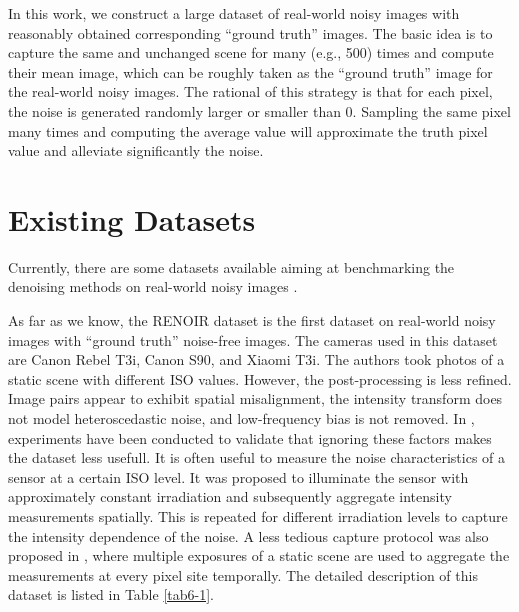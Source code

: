 In this work, we construct a large dataset of real-world noisy images with reasonably obtained corresponding ``ground truth'' images. The basic idea is to capture the same and unchanged scene for many (e.g., 500) times and compute their mean image, which can be roughly taken as the ``ground truth'' image for the real-world noisy images. The rational of this strategy is that for each pixel, the noise is generated randomly larger or smaller than 0. Sampling the same pixel many times and computing the average value will approximate the truth pixel value and alleviate significantly the noise.

\section{Existing Datasets}

Currently, there are some datasets available aiming at benchmarking the denoising methods on real-world noisy images \cite{RENOIR2014,crosschannel2016,dnd2017}.

As far as we know, the RENOIR dataset \cite{RENOIR2014} is the first dataset on real-world noisy images with ``ground truth'' noise-free images. The cameras used in this dataset are Canon Rebel T3i, Canon S90, and Xiaomi T3i. The authors took photos of a static scene with different ISO values. However, the post-processing is less refined. Image pairs appear to exhibit spatial misalignment, the intensity transform does not model heteroscedastic noise, and low-frequency bias is not removed. In \cite{RENOIR2014}, experiments have been conducted to validate that ignoring these factors makes the dataset less usefull. It is often useful to measure the noise characteristics of a sensor at a certain ISO level. It was proposed \cite{RENOIR2014} to illuminate the sensor with approximately constant irradiation and subsequently aggregate intensity measurements spatially. This is repeated for different irradiation levels to capture the intensity dependence of the noise. A less tedious capture protocol was also proposed in \cite{RENOIR2014}, where multiple exposures of a static scene are used to aggregate the measurements at every pixel site temporally. The detailed description of this dataset is listed in Table \ref{tab6-1}.

